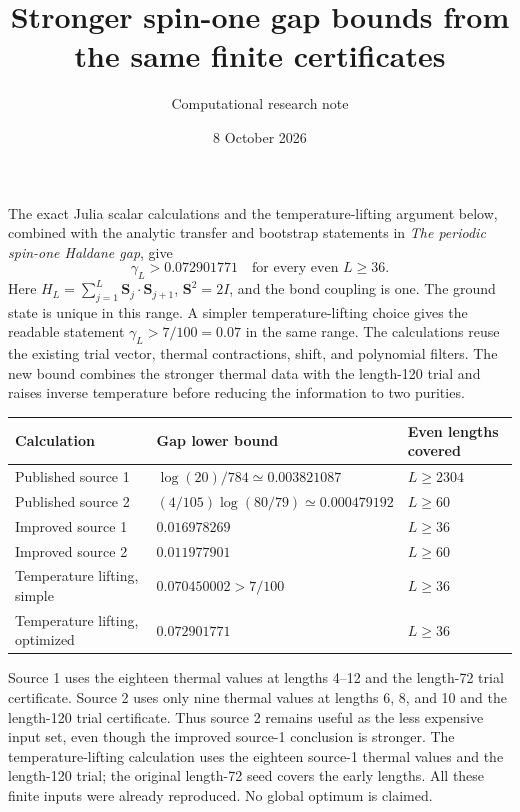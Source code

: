 \documentclass[11pt]{article}
\title{Stronger spin-one gap bounds from the same finite certificates}
\author{Computational research note}
\date{8 October 2026}
\begin{document}
\maketitle

\noindent
The exact Julia scalar calculations and the temperature-lifting argument
below, combined with the analytic transfer and bootstrap statements in
\emph{The periodic spin-one Haldane gap}, give
\[
 \boxed{\gamma_L>0.072901771\quad\text{for every even }L\ge36.}
\]
Here $H_L=\sum_{j=1}^L\mathbf S_j\cdot\mathbf S_{j+1}$, $\mathbf S^2=2I$,
and the bond coupling is one. The ground state is unique in this range.
A simpler temperature-lifting choice gives the readable statement
$\gamma_L>7/100=0.07$ in the same range. The calculations reuse the existing
trial vector, thermal contractions, shift, and polynomial filters. The new
bound combines the stronger thermal data with the length-120 trial and
raises inverse temperature before reducing the information to two purities.

\begin{center}
\begin{tabular}{lll}
\toprule
Calculation & Gap lower bound & Even lengths covered\\
\midrule
Published source 1 & $\log(20)/784\simeq0.003821087$ & $L\ge2304$\\
Published source 2 & $(4/105)\log(80/79)\simeq0.000479192$ & $L\ge60$\\
Improved source 1 & $0.016978269$ & $L\ge36$\\
Improved source 2 & $0.011977901$ & $L\ge60$\\
Temperature lifting, simple & $0.070450002>7/100$ & $L\ge36$\\
Temperature lifting, optimized & $0.072901771$ & $L\ge36$\\
\bottomrule
\end{tabular}
\end{center}

Source 1 uses the eighteen thermal values at lengths 4--12 and the length-72
trial certificate. Source 2 uses only nine thermal values at lengths 6, 8,
and 10 and the length-120 trial certificate. Thus source 2 remains useful as
the less expensive input set, even though the improved source-1 conclusion
is stronger. The temperature-lifting calculation uses the eighteen source-1
thermal values and the length-120 trial; the original length-72 seed covers
the early lengths. All these finite inputs were already reproduced.
No global optimum is claimed.
\end{document}
